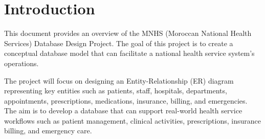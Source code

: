 \documentclass[a4paper,12pt]{article}
\begin{document}
\section{Introduction}

This document provides an overview of the MNHS (Moroccan National Health Services) Database Design Project. The goal of this project is to create a conceptual database model that can facilitate a national health service system's operations.

The project will focus on designing an Entity-Relationship (ER) diagram representing key entities such as patients, staff, hospitals, departments, appointments, prescriptions, medications, insurance, billing, and emergencies. The aim is to develop a database that can support real-world health service workflows such as patient management, clinical activities, prescriptions, insurance billing, and emergency care.
\end{document}
